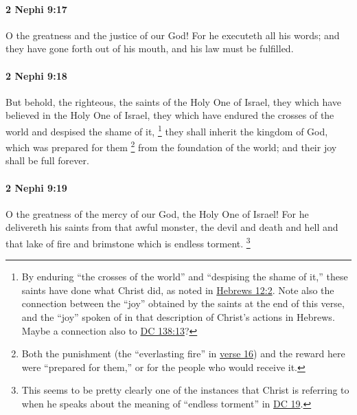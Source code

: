 		\paragraph{2 Nephi 9:17} %
			\label{2NEPHI-9-17}

			O the greatness and the justice of our God!
			For he executeth all his words;
			and they have gone forth out of his mouth,
			and his law must be fulfilled.

		\paragraph{2 Nephi 9:18} %
			\label{2NEPHI-9-18}

			But behold, the righteous, the saints of the Holy One of Israel,
			they which have believed in the Holy One of Israel,
			they which have endured the crosses of the world and despised the shame of it,%
				\footnote{%
					\label{2NEPHI-9-18-despised}%
					By enduring ``the crosses of the world'' and ``despising the shame of it,'' these saints have done what Christ did, as noted in \hyperref[HEBREWS-12-2]{Hebrews 12:2}. Note also the connection between the ``joy'' obtained by the saints at the end of this verse, and the ``joy'' spoken of in that description of Christ's actions in Hebrews. Maybe a connection also to \hyperref[DC138-13]{DC 138:13}?
					}
			they shall inherit the kingdom of God,
			which was prepared for them%
				\footnote{%
					\label{2NEPHI-9-18-prepared}%
					Both the punishment (the ``everlasting fire'' in \hyperref[2NEPHI-9-16]{verse 16}) and the reward here were ``prepared for them,'' or for the people who would receive it.
					}
			from the foundation of the world;
			and their joy shall be full forever.

		\paragraph{2 Nephi 9:19} %
			\label{2NEPHI-9-19}

			O the greatness of the mercy of our God, the Holy One of Israel!
			For he delivereth his saints from that awful monster, the devil and death and hell
			and that lake of fire and brimstone which is endless torment.%
				\footnote{%
					\label{2NEPHI-9-19-torment}%
					This seems to be pretty clearly one of the instances that Christ is referring to when he speaks about the meaning of ``endless torment'' in \hyperref[DC19]{DC 19}.
					}

